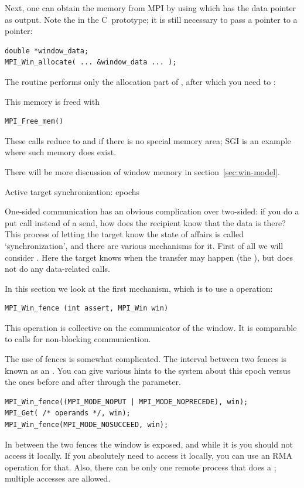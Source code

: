 Next, one can obtain the memory from MPI by using
%
%
which has the data pointer as output. Note the  in the
C~prototype; it is still necessary to pass a pointer to a pointer:
\lstset{style=reviewcode,language=C}
\begin{lstlisting}
double *window_data;
MPI_Win_allocate( ... &window_data ... );
\end{lstlisting}
The routine  performs only the allocation
part of , after which you need to
:
%

This memory is freed with
\begin{lstlisting}
MPI_Free_mem()
\end{lstlisting}
These calls reduce to  and  if there is no special
memory area; SGI is an example where such memory does exist.

There will be more discussion of window memory in section~\ref{sec:win-model}.


 {Active target synchronization: epochs}
\label{sec:fence}

One-sided communication has an obvious complication over two-sided: if
you do a put call instead of a send, how does the recipient know that
the data is there? This process of letting the target know the state
of affairs is called `synchronization', and there are various
mechanisms for it. First of all we will consider . Here the target knows when the transfer
may happen (the ), but does not do
any data-related calls.

In this section we look at the first mechanism,
which is to use a  operation:
\begin{lstlisting}
MPI_Win_fence (int assert, MPI_Win win)
\end{lstlisting}
This operation is collective on the communicator of the window.
It is comparable to  calls for non-blocking communication.

The use of fences is somewhat complicated. The interval between two fences
is known as an .
You can give various hints to the system about this epoch versus the ones
before and after through the  parameter.
\begin{lstlisting}
MPI_Win_fence((MPI_MODE_NOPUT | MPI_MODE_NOPRECEDE), win);
MPI_Get( /* operands */, win);
MPI_Win_fence(MPI_MODE_NOSUCCEED, win);
\end{lstlisting}
In between the two fences the window is exposed, and while it is you
should not access it locally. If you absolutely need to access it
locally, you can use an \ac{RMA} operation for that. Also, there can be only one
remote process that does a ; multiple  accesses are allowed.

